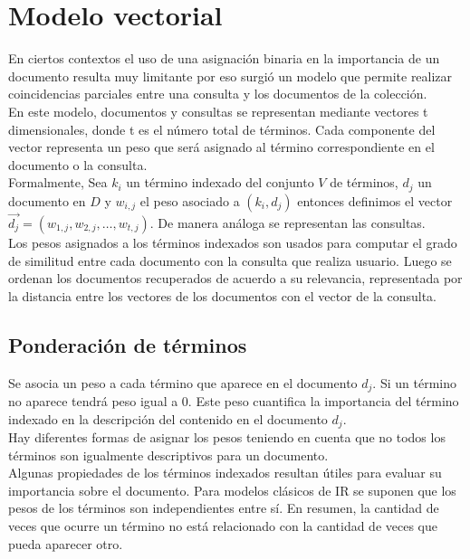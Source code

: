 \section{Modelo vectorial}

En ciertos contextos el uso de una asignación binaria en la importancia de un documento resulta muy limitante por eso surgió un modelo que permite realizar coincidencias parciales entre una consulta y los documentos de la colección. \\

En este modelo, documentos y consultas se representan mediante vectores t dimensionales, donde t es el número total de términos. Cada componente del vector representa un peso que será asignado al término correspondiente en el documento o la consulta. \\

Formalmente, Sea $k_{i}$ un término indexado del conjunto $V$ de términos, $d_{j}$ un documento en $D$ y $w_{i,j}$  el peso asociado a $(k_{i},d_{j})$ entonces definimos el vector $\overrightarrow{d_{j}}= (w_{1,j}, w_{2,j}, … , w_{t,j})$. De manera análoga se representan las consultas. \\  

Los pesos  asignados a los términos indexados son usados para computar el grado de similitud entre cada documento con la consulta que realiza usuario. Luego se ordenan los documentos recuperados de acuerdo a su relevancia, representada por la distancia entre los vectores de los documentos con el vector de la consulta.\\
\subsection{Ponderación de términos} 

Se asocia un peso a cada término que aparece en el documento $d_{j}$. Si un término no aparece tendrá peso igual a 0. Este peso cuantifica la importancia del término indexado en la descripción del contenido en el documento $d_{j}$.\\

Hay diferentes formas de asignar los pesos teniendo en cuenta que no todos los términos son igualmente descriptivos para un documento.\\

Algunas propiedades de los términos indexados resultan útiles para evaluar su importancia sobre el documento. Para modelos clásicos de IR se suponen que los pesos de los términos son independientes entre sí. En resumen, la cantidad de veces que ocurre un término no está relacionado con la cantidad de veces que pueda aparecer otro.\\

